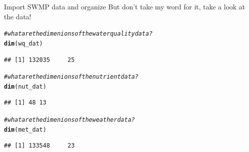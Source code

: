 \documentclass[xcolor=svgnames]{beamer}\usepackage[]{graphicx}\usepackage[]{color}
\makeatletter
\newcommand{\hlcom}[1]{\textcolor[rgb]{0.678,0.584,0.686}{\textit{#1}}}%
\newcommand{\hlstd}[1]{\textcolor[rgb]{0.345,0.345,0.345}{#1}}%
\newcommand{\hlkwd}[1]{\textcolor[rgb]{0.737,0.353,0.396}{\textbf{#1}}}%
\newenvironment{kframe}{%
 \def\at@end@of@kframe{}%
 \ifinner\ifhmode%
  \def\at@end@of@kframe{\end{minipage}}%
  \begin{minipage}{\columnwidth}%
 \fi\fi%
 \def\FrameCommand##1{\hskip\@totalleftmargin \hskip-\fboxsep
 \colorbox{shadecolor}{##1}\hskip-\fboxsep
     \hskip-\linewidth \hskip-\@totalleftmargin \hskip\columnwidth}%
 \MakeFramed {\advance\hsize-\width
   \@totalleftmargin\z@ \linewidth\hsize
   \@setminipage}}%
 {\par\unskip\endMakeFramed%
 \at@end@of@kframe}
\newenvironment{knitrout}{}{} %
\makeatother
\begin{document}
\begin{frame}[fragile]{Import SWMP data and organize}
But don't take my word for it, take a look at the data!
\begin{knitrout}\scriptsize
{}\color{fgcolor}\begin{kframe}
\begin{alltt}
\hlcom{# what are the dimenions of the water quality data?}
\hlkwd{dim}\hlstd{(wq_dat)}
\end{alltt}
\begin{verbatim}
## [1] 132035     25
\end{verbatim}
\begin{alltt}
\hlcom{# what are the dimenions of the nutrient data?}
\hlkwd{dim}\hlstd{(nut_dat)}
\end{alltt}
\begin{verbatim}
## [1] 48 13
\end{verbatim}
\begin{alltt}
\hlcom{# what are the dimenions of the weather data?}
\hlkwd{dim}\hlstd{(met_dat)}
\end{alltt}
\begin{verbatim}
## [1] 133548     23
\end{verbatim}
\end{kframe}
\end{knitrout}
\end{frame}
\end{document}
